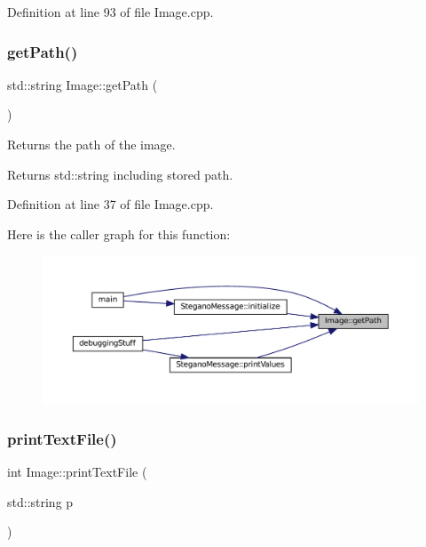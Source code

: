 Definition at line 93 of file Image.\+cpp.

\mbox{\label{classImage_a885989eb723cb0a1fc0555c7e8de817e}} 
\subsubsection{\texorpdfstring{getPath()}{getPath()}}
{\footnotesize\ttfamily std\+::string Image\+::get\+Path (\begin{DoxyParamCaption}{ }\end{DoxyParamCaption})}



Returns the path of the image. 

\begin{DoxyReturn}{Returns}
std\+::string including stored path. 
\end{DoxyReturn}


Definition at line 37 of file Image.\+cpp.

Here is the caller graph for this function\+:
\nopagebreak
\begin{figure}[H]
\begin{center}
\leavevmode
\includegraphics[width=350pt]{classImage_a885989eb723cb0a1fc0555c7e8de817e_icgraph}
\end{center}
\end{figure}
\mbox{\label{classImage_ae5daf791502caefeae1b15360d354513}} 
\subsubsection{\texorpdfstring{printTextFile()}{printTextFile()}}
{\footnotesize\ttfamily int Image\+::print\+Text\+File (\begin{DoxyParamCaption}\item[{std\+::string}]{p }\end{DoxyParamCaption})}



